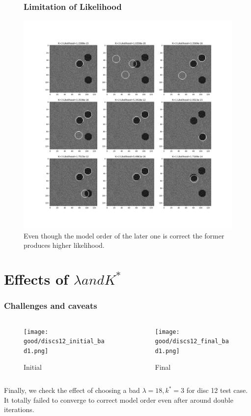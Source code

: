 \documentclass[11pt]{beamer}
\begin{document}
\begin{frame}
\begin{figure}
  \frametitle{Limitation of Likelihood}
  \includegraphics[width=.9\textwidth, height=.8\textheight ]{likelihood_fault.png}
  \caption{Even though the model order of the later one is correct the former produces higher likelihood.}
\end{figure}
\end{frame}

\section{Effects of $\lambda and K^*$}
\begin{frame}
\frametitle{Challenges and caveats}
\begin{columns}
\begin{column}{.45\textwidth}
\begin{figure}
  \texttt{[image: good/discs12\_initial\_bad1.png]}
  \caption{Initial}
\end{figure}
\end{column}
\begin{column}{.45\textwidth}
\begin{figure}
  \texttt{[image: good/discs12\_final\_bad1.png]}
  \caption{Final}
\end{figure}
\end{column}
\end{columns}
Finally, we check the effect of choosing a bad $\lambda=18, k^*=3$ for disc 12 test case. 
It totally failed to converge to correct model order even after around double iterations.
\end{frame}
\end{document}
